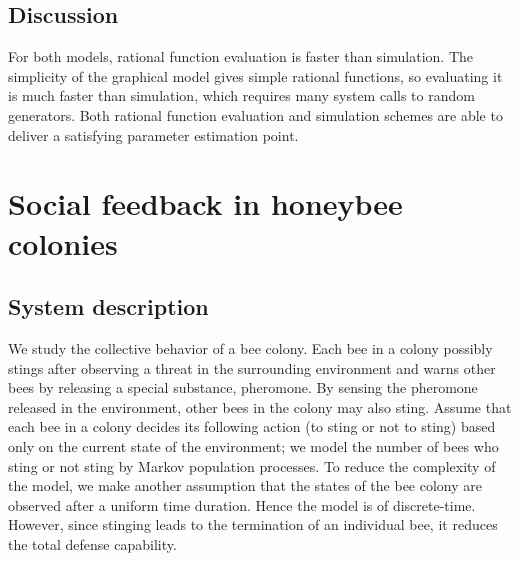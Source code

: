 \subsection{Discussion}
For both models, rational function evaluation is faster than simulation. The simplicity of the
graphical model gives simple rational functions, so evaluating it is much faster than simulation,
which requires many system calls to random generators. Both rational function evaluation and
simulation schemes are able to deliver a satisfying parameter estimation point.

\section{Social feedback in honeybee colonies}
\subsection{System description}
We study the collective behavior of a bee colony. Each bee in a colony possibly stings after
observing a threat in the surrounding environment and warns other bees by releasing a special
substance, pheromone. By sensing the pheromone released in the environment, other bees in the colony
may also sting. Assume that each bee in a colony decides its following action (to sting or not to
sting) based only on the current state of the environment; we model the number of bees who sting or
not sting by Markov population processes. To reduce the complexity of the model, we make another
assumption that the states of the bee colony are observed after a uniform time duration. Hence the
model is of discrete-time. However, since stinging leads to the termination of an individual bee, it
reduces the total defense capability.

